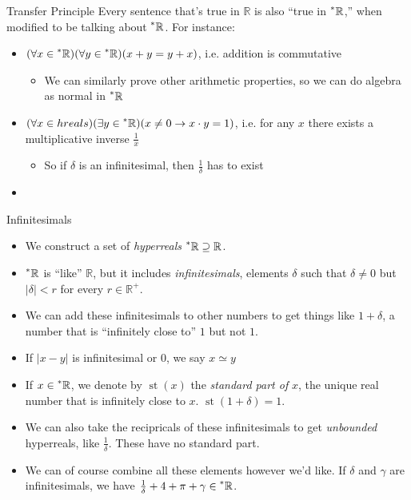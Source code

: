\documentclass{beamer}
\theoremstyle{plain}
\theoremstyle{definition}
\newcommand{\reals}{\mathbb{R}}
\newcommand{\hreals}{\prescript{*}{}{\mathbb{R}}}
\DeclareMathOperator{\st}{st}
\begin{document}
\begin{frame}{Transfer Principle}
Every sentence that's true in $\reals$ is also ``true in $\hreals$,'' when modified to be talking about $\hreals$. For instance:
\begin{itemize}
	\item $(\forall x \in \hreals)(\forall y \in \hreals)(x + y = y + x)$, i.e. addition is commutative
	\begin{itemize}
		\item We can similarly prove other arithmetic properties, so we can do algebra as normal in $\hreals$
	\end{itemize}
	\item $(\forall x \in hreals)(\exists y \in \hreals)(x \neq 0 \to x \cdot y = 1)$, i.e. for any $x$ there exists a multiplicative inverse $\frac{1}{x}$
	\begin{itemize}
		\item So if $\delta$ is an infinitesimal, then $\frac{1}{\delta}$ has to exist
	\end{itemize}
	\item 
\end{itemize}
\end{frame}



\begin{frame}{Infinitesimals}
\begin{itemize}
	\item We construct a set of \textit{hyperreals} $\hreals \supseteq \reals$.
	\item $\hreals$ is ``like'' $\reals$, but it includes \textit{infinitesimals}, elements $\delta$ such that $\delta \neq 0$ but $|\delta| < r$ for every $r \in \reals^+$.
	\item We can add these infinitesimals to other numbers to get things like $1 + \delta$, a number that is ``infinitely close to'' $1$ but not $1$. 
	\item If $|x - y|$ is infinitesimal or $0$, we say $x \simeq y$
	\item If $x \in \hreals$, we denote by $\st(x)$ the \textit{standard part of} $x$, the unique real number that is infinitely close to $x$. $\st(1 + \delta) = 1$. 
	\item We can also take the recipricals of these infinitesimals to get \textit{unbounded} hyperreals, like $\frac{1}{\delta}$. These have no standard part.
	\item We can of course combine all these elements however we'd like. If $\delta$ and $\gamma$ are infinitesimals, we have $\frac{1}{\delta} + 4 + \pi + \gamma \in \hreals$.
\end{itemize}
\end{frame}
\end{document}
